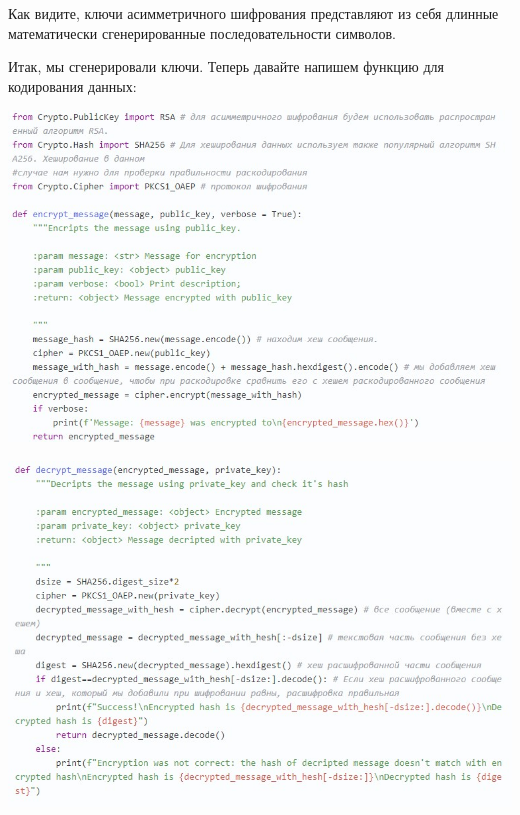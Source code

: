 \documentclass[12pt]{article}
\begin{document}
	Как видите, ключи асимметричного шифрования представляют из себя длинные математически сгенерированные последовательности символов.
	
	\vspace{1cm}
	
	Итак, мы сгенерировали ключи. Теперь давайте напишем функцию для кодирования данных:
	
	\begin{center}
		\includegraphics[width=1\linewidth]{pictures/code7.jpg}
	\end{center}

\begin{center}
	\includegraphics[width=1\linewidth]{pictures/code8.jpg}
\end{center}
\end{document}
